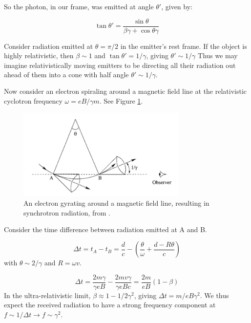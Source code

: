 So the photon, in our frame, was emitted at angle $\theta'$, given by:

\begin{equation}
\tan\theta'=\frac{\sin\theta}{\beta\gamma+\cos\theta\gamma}
\end{equation}

Consider radiation emitted at $\theta=\pi/2$ in the emitter's rest frame. If the object is highly relativistic, then $\beta\sim1$ and $\tan\theta'=1/\gamma$, giving $\theta'\sim1/\gamma$ Thus we may imagine relativistically moving emitters to be directing all their radiation out ahead of them into a cone with half angle $\theta'\sim1/\gamma$. 

Now consider an electron spiraling around a magnetic field line at the relativistic cyclotron frequency $\omega=eB/\gamma m$. See Figure \ref{fig:synchrotrondiagram}. 

\begin{figure}[h]
    \centering
    \includegraphics[width=0.75\textwidth]{chap0_intro/synchrotrondiagram.png}
    \caption[Diagram of electron gyration around a magnetic field line, resulting in synchrotron radiation.]{An electron gyrating around a magnetic field line, resulting in synchrotron radiation, from \citet{choudhuri2010astrophysics}.}
    \label{fig:synchrotrondiagram}
\end{figure}

Consider the time difference between radiation emitted at A and B. 

\begin{equation}
\Delta t=t_A-t_B=\frac{d}{c}-\left(\frac{\theta}{\omega}+\frac{d-R\theta}{c}\right)
\end{equation}
with $\theta\sim2/\gamma$ and $R=\omega v$. 

\begin{equation}
\Delta t = \frac{2m\gamma}{\gamma e B}-\frac{2mv\gamma}{\gamma eB c}=\frac{2m}{eB}(1-\beta)
\end{equation}
In the ultra-relativistic limit, $\beta\approx1-1/2\gamma^2$, giving $\Delta t=m/eB\gamma^2$. We thus expect the received radiation to have a strong frequency component at $f\sim1/\Delta t\to f\sim\gamma^2$. 

